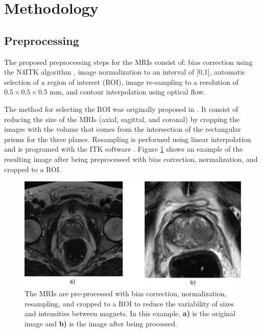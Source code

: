 \section{Methodology}
\label{sec:methods}



\subsection{Preprocessing}
\label{subsec:prepro}
The proposed preprocessing steps for the MRIs consist of: bias correction using the N4ITK algorithm \cite{n4itk}, image normalization to an interval of [0,1], automatic selection of a region of interest (ROI), image re-sampling to a resolution of $0.5 \times 0.5 \times 0.5$ mm, and contour interpolation using optical flow.  

The method for selecting the ROI was originally proposed in \cite{anneke}. It consist of reducing the size of the MRIs (axial, sagittal, and coronal) by cropping the images with the volume that comes from the intersection of the rectangular prisms for the three planes. Resampling is performed using linear interpolation and is programed with the ITK software \cite{itk}.  Figure \ref{fig_1} shows an example of the resulting image after being preprocessed with bias correction, normalization, and cropped to a ROI. 

\begin{figure}[h]
    \centering
    \includegraphics[totalheight=.25\textheight]{figures/Figure1.eps}
    \caption{The MRIs are pre-processed with bias correction, normalization, resampling, and cropped to a ROI to reduce the variability of sizes and intensities between magnets. In this example, \textbf{a)} is the original image and \textbf{b)} is the image after being processed.} 
    \label{fig_1}
\end{figure}

